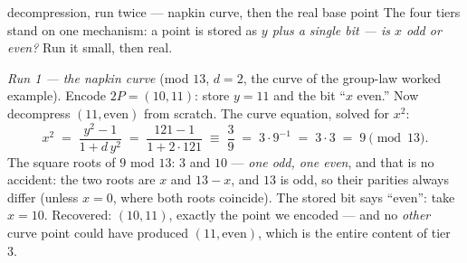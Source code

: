 \begin{worked}{decompression, run twice --- napkin curve, then the real base point}
The four tiers stand on one mechanism: a point is stored as \emph{$y$
plus a single bit --- is $x$ odd or even?} Run it small, then real.

\emph{Run 1 --- the napkin curve} (mod $13$, $d = 2$, the curve of the
group-law worked example). Encode $2P = (10, 11)$: store $y = 11$ and the
bit ``$x$ even.'' Now decompress $(11, \text{even})$ from scratch. The
curve equation, solved for $x^2$:
\[
x^2 \;=\; \frac{y^2 - 1}{1 + d\,y^2}
\;=\; \frac{121 - 1}{1 + 2\cdot 121}
\;\equiv\; \frac{3}{9}
\;=\; 3 \cdot 9^{-1} \;=\; 3\cdot 3 \;=\; 9 \pmod{13}.
\]
The square roots of $9$ mod $13$: $3$ and $10$ --- \emph{one odd, one
even}, and that is no accident: the two roots are $x$ and $13 - x$, and
$13$ is odd, so their parities always differ (unless $x = 0$, where both
roots coincide). The stored bit says ``even'': take $x = 10$. Recovered:
$(10, 11)$, exactly the point we encoded --- and no \emph{other} curve
point could have produced $(11, \text{even})$, which is the entire
content of tier 3.


\end{worked}
